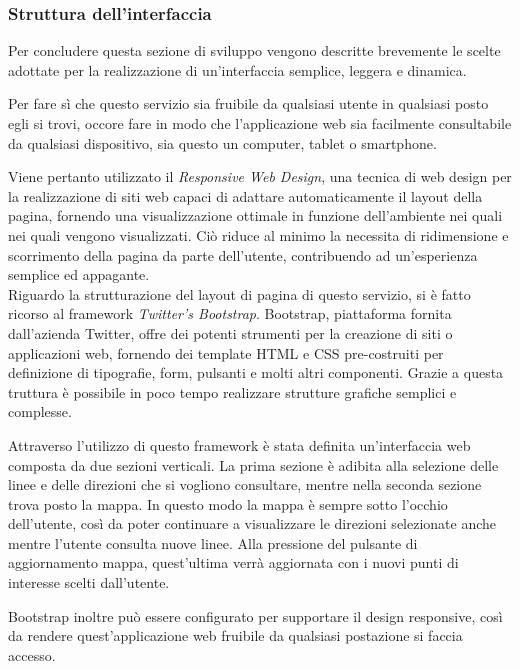 \subsubsection{Struttura dell'interfaccia} %
\label{ssub:struttura_dell_interfaccia}

Per concludere questa sezione di sviluppo vengono descritte brevemente le scelte adottate per la realizzazione di un'interfaccia semplice, leggera e dinamica.

Per fare sì che questo servizio sia fruibile da qualsiasi utente in qualsiasi posto egli si trovi, occore fare in modo che l'applicazione web sia facilmente consultabile da qualsiasi dispositivo, sia questo un computer, tablet o smartphone.

Viene pertanto utilizzato il {\itshape Responsive Web Design}, una tecnica di web design per la realizzazione di siti web capaci di adattare automaticamente il layout della pagina, fornendo una visualizzazione ottimale in funzione dell'ambiente nei quali nei quali vengono visualizzati. Ciò riduce al minimo la necessita di ridimensione e scorrimento della pagina da parte dell'utente, contribuendo ad un'esperienza semplice ed appagante.\\

Riguardo la strutturazione del layout di pagina di questo servizio, si è fatto ricorso al framework {\itshape Twitter's Bootstrap}.
Bootstrap, piattaforma fornita dall'azienda Twitter, offre dei potenti strumenti per la creazione di siti o applicazioni web, fornendo dei template HTML e CSS pre-costruiti per definizione di tipografie, form, pulsanti e molti altri componenti. Grazie a questa truttura è possibile in poco tempo realizzare strutture grafiche semplici e complesse.

Attraverso l'utilizzo di questo framework è stata definita un'interfaccia web composta da due sezioni verticali. La prima sezione è adibita alla selezione delle linee e delle direzioni che si vogliono consultare, mentre nella seconda sezione trova posto la mappa. In questo modo la mappa è sempre sotto l'occhio dell'utente, così da poter continuare a visualizzare le direzioni selezionate anche mentre l'utente consulta nuove linee. Alla pressione del pulsante di aggiornamento mappa, quest'ultima verrà aggiornata con i nuovi punti di interesse scelti dall'utente.

Bootstrap inoltre può essere configurato per supportare il design responsive, così da rendere quest'applicazione web fruibile da qualsiasi postazione si faccia accesso.


